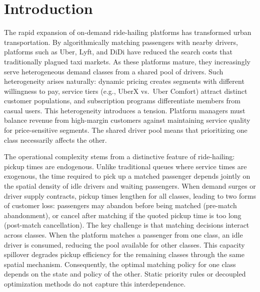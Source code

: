 \section{Introduction}\label{sec:Introduction}



The rapid expansion of on-demand ride-hailing platforms has transformed urban transportation.
By algorithmically matching passengers with nearby drivers, platforms such as Uber, Lyft, and DiDi have reduced the search costs that traditionally plagued taxi markets.
As these platforms mature, they increasingly serve heterogeneous demand classes from a shared pool of drivers.
Such heterogeneity arises naturally: dynamic pricing creates segments with different willingness to pay, service tiers (e.g., UberX vs.\ Uber Comfort) attract distinct customer populations, and subscription programs differentiate members from casual users.
This heterogeneity introduces a tension.
Platform managers must balance revenue from high-margin customers against maintaining service quality for price-sensitive segments.
The shared driver pool means that prioritizing one class necessarily affects the other.

The operational complexity stems from a distinctive feature of ride-hailing: pickup times are endogenous.
Unlike traditional queues where service times are exogenous, the time required to pick up a matched passenger depends jointly on the spatial density of idle drivers and waiting passengers.
When demand surges or driver supply contracts, pickup times lengthen for all classes, leading to two forms of customer loss: passengers may abandon before being matched (pre-match abandonment), or cancel after matching if the quoted pickup time is too long (post-match cancellation).
The key challenge is that matching decisions interact across classes.
When the platform matches a passenger from one class, an idle driver is consumed, reducing the pool available for other classes.
This capacity spillover degrades pickup efficiency for the remaining classes through the same spatial mechanism.
Consequently, the optimal matching policy for one class depends on the state and policy of the other.
Static priority rules or decoupled optimization methods do not capture this interdependence.

